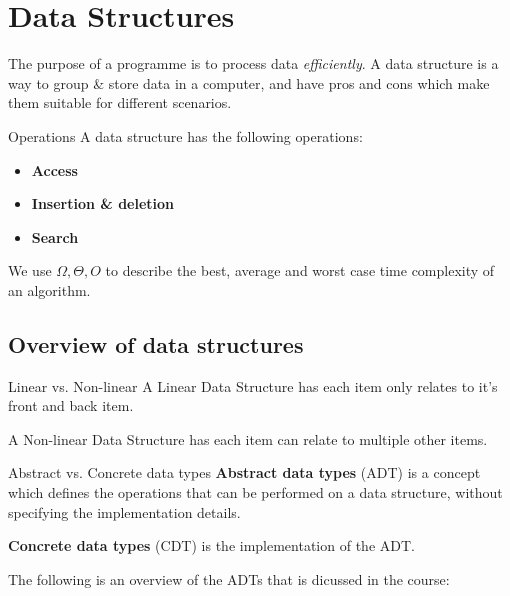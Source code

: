 \section{Data Structures}

The purpose of a programme is to process data \textit{efficiently}.
A data structure is a way to group \& store data in a computer, and have pros and cons which make them suitable for different scenarios.

\begin{knBox}
    {Operations}
    A data structure has the following operations:
    \begin{itemize}
        \item \textbf{Access}
        \item \textbf{Insertion \& deletion}
        \item \textbf{Search}
    \end{itemize}
\end{knBox}

We use $\Omega, \Theta, O$ to describe the best, average and worst case time complexity of an algorithm.

\subsection{Overview of data structures}

\begin{definition}
    {Linear vs. Non-linear}
    A Linear Data Structure has each item only relates to it's front and back item.

    A Non-linear Data Structure has each item can relate to multiple other items.
\end{definition}

\begin{theorem}
    {Abstract vs. Concrete data types}
    \textbf{Abstract data types} (ADT) is a concept which defines the operations that can be performed on a data structure, without specifying the implementation details.

    \textbf{Concrete data types} (CDT) is the implementation of the ADT.
\end{theorem}

The following is an overview of the ADTs that is dicussed in the course:

